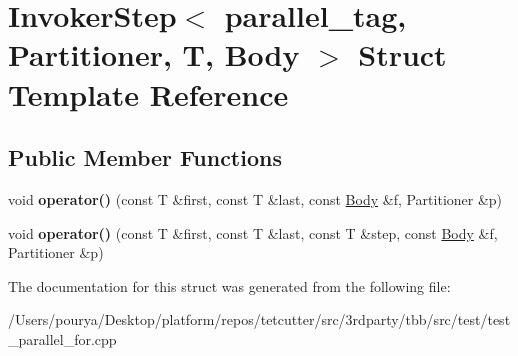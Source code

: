 \hypertarget{structInvokerStep_3_01parallel__tag_00_01Partitioner_00_01T_00_01Body_01_4}{}\section{Invoker\+Step$<$ parallel\+\_\+tag, Partitioner, T, Body $>$ Struct Template Reference}
\label{structInvokerStep_3_01parallel__tag_00_01Partitioner_00_01T_00_01Body_01_4}
\subsection*{Public Member Functions}
\begin{DoxyCompactItemize}
\item 
\hypertarget{structInvokerStep_3_01parallel__tag_00_01Partitioner_00_01T_00_01Body_01_4_ae342e999c73536fb5c349d7362d54694}{}void {\bfseries operator()} (const T \&first, const T \&last, const \hyperlink{classBody}{Body} \&f, Partitioner \&p)\label{structInvokerStep_3_01parallel__tag_00_01Partitioner_00_01T_00_01Body_01_4_ae342e999c73536fb5c349d7362d54694}

\item 
\hypertarget{structInvokerStep_3_01parallel__tag_00_01Partitioner_00_01T_00_01Body_01_4_a9c202011f3824a9a98ca8f2364b5a02a}{}void {\bfseries operator()} (const T \&first, const T \&last, const T \&step, const \hyperlink{classBody}{Body} \&f, Partitioner \&p)\label{structInvokerStep_3_01parallel__tag_00_01Partitioner_00_01T_00_01Body_01_4_a9c202011f3824a9a98ca8f2364b5a02a}

\end{DoxyCompactItemize}


The documentation for this struct was generated from the following file\+:\begin{DoxyCompactItemize}
\item 
/\+Users/pourya/\+Desktop/platform/repos/tetcutter/src/3rdparty/tbb/src/test/test\+\_\+parallel\+\_\+for.\+cpp\end{DoxyCompactItemize}

